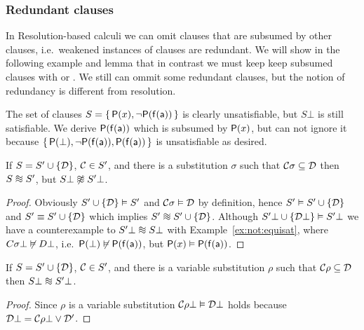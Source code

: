 \subsubsection{Redundant clauses}

In Resolution-based calculi
we can omit clauses that are subsumed
by other clauses, 
i.e.~weakened instances of clauses are redundant.
%
We will show in the following example and lemma 
that in contrast 
we must keep keep subsumed clauses
with \InstGen or \InstGenEQ.
We still can ommit some redundant clauses,
but the notion of redundancy is different from resolution.

\begin{example}\label{ex:not:equisat}
	The set of clauses \( S = \{ \,
	\mathsf{P}(x), \lnot\mathsf{P}(\mathsf{f}(\mathsf{a}))
	\, \} \) is clearly unsatisfiable, but
	\( S\bot \) is still satisfiable.
	We derive \( \mathsf{P}(\mathsf{f}(\mathsf{a})) \) which is subsumed by \( \mathsf{P}(x) \),
	but can not ignore it because \( \{ \,
	\mathsf{P}(\bot), \lnot\mathsf{P}(\mathsf{f}(\mathsf{a})), \mathsf{P}(\mathsf{f}(\mathsf{a}))
	\, \} \) is unsatisfiable as desired.
\end{example}

\begin{lemma}
	If \( S = S' \cup \{ \mathcal{D} \} \),
	\( \mathcal{C} \in S' \), and there is a substitution \( \sigma \)
	such that \( \mathcal{C}\sigma \subseteq \mathcal{D} \)
	then
	\( S  \equisat S' \),
	but \( S\bot  \not\equisat S'\bot \).
\end{lemma}
\begin{proof}
	Obviously \( S'\cup \{ \mathcal{D} \} \vDash S' \) and
	\( \mathcal{C}\sigma\vDash\mathcal{D} \) by definition, hence
	\( S' \vDash S'\cup \{ \mathcal{D} \} \) and
	\( S' \equiv S'\cup \{ \mathcal{D} \} \) which implies
	\( S' \equisat S' \cup \{ \mcD \} \).
%
	Although \( S'\bot\cup \{ \mathcal{D}\bot \} \vDash S'\bot \)
	we have a counterexample to
	\( S'\bot \equisat S\bot \) with Example~\ref{ex:not:equisat},
	where \( C\sigma\bot \not\vDash D\bot \),
	i.e.~\( \mathsf{P}(\bot)\not\vDash\mathsf{P}(\mathsf{f}(\mathsf{a})) \), but \( \mathsf{P}(x)\vDash\mathsf{P}(\mathsf{f}(\mathsf{a}))  \).
\end{proof}
\begin{lemma}\label{lem:weakend:variants}
	If \( S = S' \cup \{ \mathcal{D} \} \),
	\( \mathcal{C} \in S' \), and there is a variable substitution \( \rho \)
	such that \( \mathcal{C}\rho \subseteq \mathcal{D} \)
	then
	\( S\bot\equisat S'\bot \).
\end{lemma}
\begin{proof}
	Since \( \rho \) is a variable substitution
	\( \mathcal{C}\rho\bot \vDash \mathcal{D}\bot \) holds
	because \( \mathcal{D}\bot = \mathcal{C}\rho\bot \lor \mathcal{D}' \).
\end{proof}

